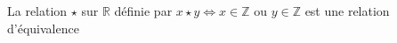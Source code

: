 La relation $\star$ sur $\mathbb R$ définie par $x\star y \iff x\in \mathbb Z$ ou $y\in \mathbb Z$ est une relation d'équivalence

\begin{reponses}
\end{reponses}

